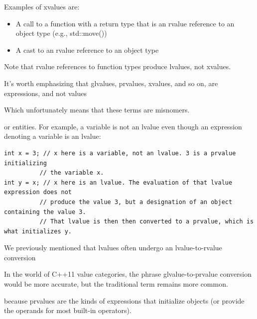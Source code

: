 Examples of xvalues are:

\begin{itemize}
\item 
A call to a function with a return type that is an rvalue reference to an object type (e.g., std::move())

\item 
A cast to an rvalue reference to an object type
\end{itemize}

Note that rvalue references to function types produce lvalues, not xvalues.

It’s worth emphasizing that glvalues, prvalues, xvalues, and so on, are expressions, and not values

\begin{tcolorbox}[colback=webgreen!5!white,colframe=webgreen!75!black]
\hspace*{0.75cm}Which unfortunately means that these terms are misnomers.
\end{tcolorbox}

or entities. For example, a variable is not an lvalue even though an expression denoting a variable is an lvalue:

\begin{lstlisting}[style=styleCXX]
int x = 3; // x here is a variable, not an lvalue. 3 is a prvalue initializing
		  // the variable x.
int y = x; // x here is an lvalue. The evaluation of that lvalue expression does not
		  // produce the value 3, but a designation of an object containing the value 3.
		  // That lvalue is then then converted to a prvalue, which is what initializes y.
\end{lstlisting}


We previously mentioned that lvalues often undergo an lvalue-to-rvalue conversion

\begin{tcolorbox}[colback=webgreen!5!white,colframe=webgreen!75!black]
\hspace*{0.75cm}In the world of C++11 value categories, the phrase glvalue-to-prvalue conversion would be more accurate, but the traditional term remains more common.
\end{tcolorbox}

because prvalues are the kinds of expressions that initialize objects (or provide the operands for most built-in operators).

